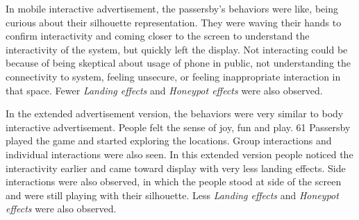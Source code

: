 \begin{itemize}
In mobile interactive advertisement, the passersby’s behaviors were like, being curious about their silhouette representation. They were waving their hands to confirm interactivity and coming closer to the screen to understand the interactivity of the system, but quickly left the display. Not interacting could be because of being skeptical about usage of phone in public, not understanding the connectivity to system, feeling unsecure, or feeling inappropriate interaction in that space. Fewer \emph{Landing effects} and \emph{Honeypot effects} were also observed.

In the extended advertisement version, the behaviors were very similar to body interactive advertisement. People felt the sense of joy, fun and play. 61 Passersby played the game and started exploring the locations. Group interactions and individual interactions were also seen. In this extended version people noticed the interactivity earlier and came toward display with very less landing effects. Side interactions were also observed, in which the people stood at side of the screen and were still playing with their silhouette. Less \emph{Landing effects} and \emph{Honeypot effects} were also observed.


 
\end{itemize}

